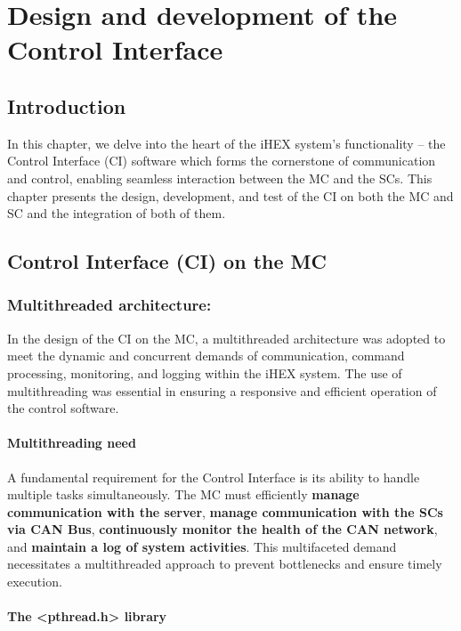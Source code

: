 \chapter{Design and development of the Control Interface}

\renewcommand{\chaptername}{Chapter}
\section*{Introduction}
In this chapter, we delve into the heart of the iHEX system's functionality – the Control Interface (CI) software which forms the cornerstone of communication and control, enabling seamless interaction between the MC and the SCs. This chapter presents the design, development, and test of the CI on both the MC and SC and the integration of both of them.

\section{Control Interface (CI) on the MC}
\subsection{Multithreaded architecture:}
In the design of the CI on the MC, a multithreaded architecture was adopted to meet the dynamic and concurrent demands of communication, command processing, monitoring, and logging within the iHEX system. The use of multithreading was essential in ensuring a responsive and efficient operation of the control software.

\subsubsection{Multithreading need}

A fundamental requirement for the Control Interface is its ability to handle multiple tasks simultaneously. The MC must efficiently \textbf{manage communication with the server}, \textbf{manage communication with the SCs via CAN Bus}, \textbf{continuously monitor the health of the CAN network}, and \textbf{maintain a log of system activities}. This multifaceted demand necessitates a multithreaded approach to prevent bottlenecks and ensure timely execution.

\subsubsection{The <pthread.h> library}

